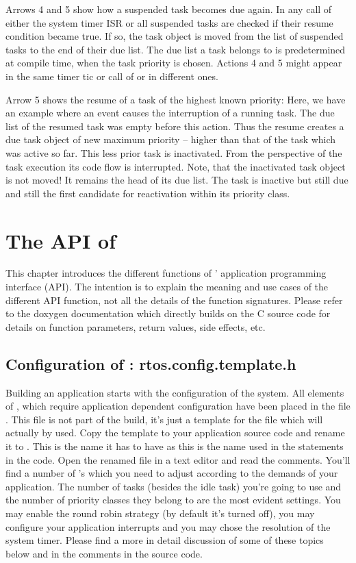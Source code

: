 Arrows 4 and 5 show how a suspended task becomes due again. In any call of
either the system timer ISR or  all suspended tasks are
checked if their resume condition became true. If so, the task object is
moved from the list of suspended tasks to the end of their due list. The
due list a task belongs to is predetermined at compile time, when the task
priority is chosen. Actions 4 and 5 might appear in the same timer tic or
call of  or in different ones.

Arrow 5 shows the resume of a task of the highest known priority: Here, we
have an example where an event causes the interruption of a running task.
The due list of the resumed task was empty before this action. Thus the
resume creates a due task object of new maximum priority -- higher than
that of the task which was active so far. This less prior task is
inactivated. From the perspective of the task execution its code flow is
interrupted. Note, that the inactivated task object is not moved! It
remains the head of its due list. The task is inactive but still due and
still the first candidate for reactivation within its priority class.



\chapter{The API of \rtos}
\label{secAPI}

This chapter introduces the different functions of \rtos' application
programming interface (API). The intention is to explain the meaning and
use cases of the different API function, not all the details of the
function signatures. Please refer to the doxygen documentation which
directly builds on the C source code for details on function parameters,
return values, side effects, etc.


\section{Configuration of \rtos: rtos.config.template.h}

Building an \rtos{} application starts with the configuration of the
system. All elements of \rtos{}, which require application dependent
configuration have been placed in the file .
This file is not part of the build, it's just a template for the file which
will actually by used. Copy the template to your application source code
and rename it to . This is the name it has to have as
this is the name used in the  statements in the code.
Open the renamed file in a text editor and read the comments. You'll find
a number of 's which you need to adjust according to the
demands of your application. The number of tasks (besides the idle task)
you're going to use and the number of priority classes they belong to are
the most evident settings. You may enable the round robin strategy (by
default it's turned off), you may configure your application interrupts
and you may chose the resolution of the system timer. Please find a more
in detail discussion of some of these topics below and in the comments in
the source code.

